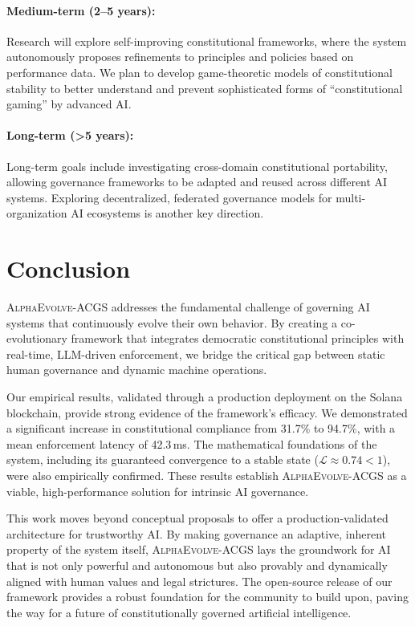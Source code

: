 \documentclass[10pt,twocolumn]{article}
\newcommand{\acgs}{\textsc{AlphaEvolve-ACGS}}
\newcommand{\lipschitz}{\mathcal{L}}
\theoremstyle{definition}
\begin{document}
\paragraph{Medium-term (2--5 years):} Research will explore self-improving constitutional frameworks, where the system autonomously proposes refinements to principles and policies based on performance data. We plan to develop game-theoretic models of constitutional stability to better understand and prevent sophisticated forms of ``constitutional gaming'' by advanced AI.

\paragraph{Long-term (>5 years):} Long-term goals include investigating cross-domain constitutional portability, allowing governance frameworks to be adapted and reused across different AI systems. Exploring decentralized, federated governance models for multi-organization AI ecosystems is another key direction.

\section{Conclusion}
\label{sec:conclusion}
\acgs{} addresses the fundamental challenge of governing AI systems that continuously evolve their own behavior. By creating a co-evolutionary framework that integrates democratic constitutional principles with real-time, LLM-driven enforcement, we bridge the critical gap between static human governance and dynamic machine operations.

Our empirical results, validated through a production deployment on the Solana blockchain, provide strong evidence of the framework's efficacy. We demonstrated a significant increase in constitutional compliance from 31.7\% to 94.7\%, with a mean enforcement latency of 42.3\,ms. The mathematical foundations of the system, including its guaranteed convergence to a stable state ($\lipschitz \approx 0.74 < 1$), were also empirically confirmed. These results establish \acgs{} as a viable, high-performance solution for intrinsic AI governance.

This work moves beyond conceptual proposals to offer a production-validated architecture for trustworthy AI. By making governance an adaptive, inherent property of the system itself, \acgs{} lays the groundwork for AI that is not only powerful and autonomous but also provably and dynamically aligned with human values and legal strictures. The open-source release of our framework provides a robust foundation for the community to build upon, paving the way for a future of constitutionally governed artificial intelligence.
\end{document}
